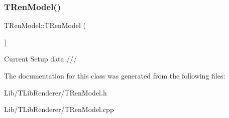 \subsubsection{\texorpdfstring{T\+Ren\+Model()}{TRenModel()}}
{\footnotesize\ttfamily T\+Ren\+Model\+::\+T\+Ren\+Model (\begin{DoxyParamCaption}{ }\end{DoxyParamCaption})}

Current Setup data /// 

The documentation for this class was generated from the following files\+:\begin{DoxyCompactItemize}
\item 
Lib/\+T\+Lib\+Renderer/T\+Ren\+Model.\+h\item 
Lib/\+T\+Lib\+Renderer/T\+Ren\+Model.\+cpp\end{DoxyCompactItemize}
